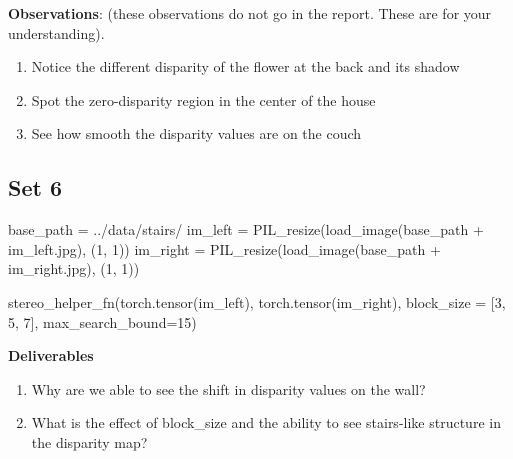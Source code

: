 \documentclass[
  letterpaper,
  DIV=11,
  numbers=noendperiod]{scrartcl}
\newenvironment{Shaded}{\begin{snugshade}}{\end{snugshade}}
\newcommand{\DecValTok}[1]{\textcolor[rgb]{0.68,0.00,0.00}{#1}}
\newcommand{\NormalTok}[1]{\textcolor[rgb]{0.00,0.23,0.31}{#1}}
\newcommand{\OperatorTok}[1]{\textcolor[rgb]{0.37,0.37,0.37}{#1}}
\newcommand{\StringTok}[1]{\textcolor[rgb]{0.13,0.47,0.30}{#1}}
\providecommand{\tightlist}{%
  \setlength{\itemsep}{0pt}\setlength{\parskip}{0pt}}\usepackage{longtable,booktabs,array}
\begin{document}
\textbf{Observations}: (these observations do not go in the report.
These are for your understanding).

\begin{enumerate}
\def\labelenumi{\arabic{enumi}.}
\tightlist
\item
  Notice the different disparity of the flower at the back and its
  shadow
\item
  Spot the zero-disparity region in the center of the house
\item
  See how smooth the disparity values are on the couch
\end{enumerate}

\hypertarget{set-6}{%
\subsection{Set 6}\label{set-6}}

\begin{Shaded}
\begin{Highlighting}[]
\NormalTok{base\_path }\OperatorTok{=} \StringTok{\textquotesingle{}../data/stairs/\textquotesingle{}}
\NormalTok{im\_left }\OperatorTok{=}\NormalTok{ PIL\_resize(load\_image(base\_path }\OperatorTok{+} \StringTok{\textquotesingle{}im\_left.jpg\textquotesingle{}}\NormalTok{), (}\DecValTok{1}\NormalTok{, }\DecValTok{1}\NormalTok{))}
\NormalTok{im\_right }\OperatorTok{=}\NormalTok{ PIL\_resize(load\_image(base\_path }\OperatorTok{+} \StringTok{\textquotesingle{}im\_right.jpg\textquotesingle{}}\NormalTok{), (}\DecValTok{1}\NormalTok{, }\DecValTok{1}\NormalTok{))}
\end{Highlighting}
\end{Shaded}

\begin{Shaded}
\begin{Highlighting}[]
\NormalTok{stereo\_helper\_fn(torch.tensor(im\_left), torch.tensor(im\_right), block\_size }\OperatorTok{=}\NormalTok{ [}\DecValTok{3}\NormalTok{, }\DecValTok{5}\NormalTok{, }\DecValTok{7}\NormalTok{], max\_search\_bound}\OperatorTok{=}\DecValTok{15}\NormalTok{)}
\end{Highlighting}
\end{Shaded}

\textbf{Deliverables}

\begin{enumerate}
\def\labelenumi{\arabic{enumi}.}
\tightlist
\item
  Why are we able to see the shift in disparity values on the wall?
\item
  What is the effect of block\_size and the ability to see stairs-like
  structure in the disparity map?
\end{enumerate}
\end{document}
